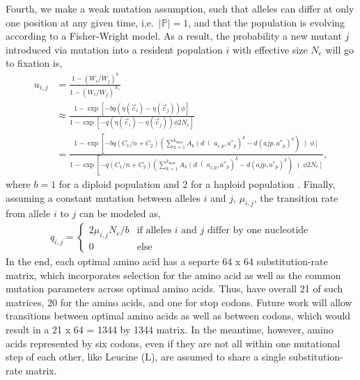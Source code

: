 \documentclass{article}
\newcommand{\setP}{\ensuremath{\mathbb{P}}\xspace}
\newcommand{\Ne}{\ensuremath{{N_e}}\xspace}
\newcommand{\kmax}{\ensuremath{{k_{\max}}}\xspace}
\newcommand{\cvec}{\ensuremath{\Vec{c}}\xspace}
\newcommand{\cveci}{\ensuremath{\cvec_i}\xspace}
\newcommand{\cvecj}{\ensuremath{\cvec_j}\xspace}
\newcommand{\aip}{\ensuremath{a_{i,p}}\xspace}
\newcommand{\aopt}{\ensuremath{a^*}\xspace}
\newcommand{\aoptp}{\ensuremath{\aopt_p}\xspace}
\begin{document}
Fourth, we make a weak mutation assumption, such that alleles can differ at only one position at any given time, i.e.~$|\setP| = 1$, and that the population is evolving according to a Fisher-Wright model.
As a result, the probability a new mutant $j$ introduced via mutation into a resident population $i$ with effective size \Ne will go to fixation is,
\begin{align*}
  u_{i,j} &=  \frac{1 - \left(W_i/W_j\right)^b}{1 - \left(W_i/W_j\right)^\Ne}\\
   &\approx \frac{1-\exp\left[- b q \left(\eta(\cveci)- \eta(\cvecj)\right) \phi\right]}{1-\exp\left[- q \left(\eta(\cveci)- \eta(\cvecj)\right) \phi 2\Ne\right]}\\
   &= \frac{1- \exp\left[- b q \left(C_1/n + C_2\right)\left(\sum_{k=1}^\kmax A_k \left(d\right(\aip,\aoptp\right)^k - d\left(ajp,\aoptp\right)^k\right)\left) \phi\right]}{1-\exp\left[- q \left(C_1/n + C_2\right)\left(\sum_{k=1}^\kmax A_k \left(d\right(\aip,\aoptp\right)^k - d\left(ajp,\aoptp\right)^k\right)\left) \phi 2 \Ne\right]},
\end{align*}
where $b=1$ for a diploid population and $2$ for a haploid population \cite{Iwasa88,BergAndLassig03,SellaAndHirsh05}.
Finally, assuming a constant mutation between alleles $i$ and $j$, $\mu_{i,j}$, the transition rate from allele $i$ to $j$ can be modeled as,
\begin{align*}
  q_{i,j} = \begin{cases} 2 \mu_{i,j} \Ne /b & \text{if alleles $i$ and $j$ differ by one nucleotide}\\
    0 & \text{else}
  \end{cases}
\end{align*}
In the end, each optimal amino acid has a separte 64 x 64 substitution-rate matrix, which incorporates selection for the amino acid as well as the common mutation parameters across optimal amino acids. 
Thus, have overall 21 of such matrices, 20 for the amino acids, and one for stop codons.
Future work will allow transitions between optimal amino acids as well as between codons, which would result in a 21 x 64 = 1344 by 1344 matrix. 
In the meantime, however, amino acids represented by six codons, even if they are not all within one mutational step of each other, like Leucine (L), are assumed to share a single substitution-rate matrix.
\end{document}
